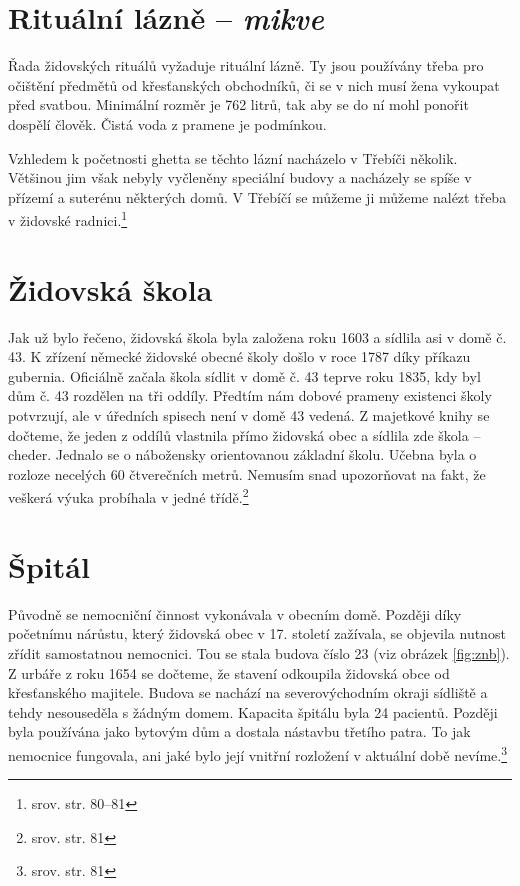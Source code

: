 \documentclass[a4paper,oneside,12pt]{report}
\begin{document}
\section{Rituální lázně -- \textit{mikve}}

Řada židovských rituálů vyžaduje rituální lázně.
Ty jsou používány třeba pro očištění předmětů od křesťanských obchodníků, či se v nich musí žena vykoupat před svatbou.
Minimální rozměr je 762 litrů, tak aby se do ní mohl ponořit dospělí člověk.
Čistá voda z pramene je podmínkou.

Vzhledem k početnosti ghetta se těchto lázní nacházelo v Třebíči několik.
Většinou jim však nebyly vyčleněny speciální budovy a nacházely se spíše v přízemí a suterénu některých domů.
V Třebíčí se můžeme ji můžeme nalézt třeba v židovské radnici.\footnote{srov. \cite{Fiser2005} str. 80--81}

\section{Židovská škola}

Jak už bylo řečeno, židovská škola byla založena roku 1603 a sídlila asi v domě č. 43.
K zřízení německé židovské obecné školy došlo v roce 1787 díky příkazu gubernia.
Oficiálně začala škola sídlit v domě č. 43 teprve roku 1835, kdy byl dům č. 43 rozdělen na tři oddíly.
Předtím nám dobové prameny existenci školy potvrzují, ale v úředních spisech není v domě 43 vedená.
Z majetkové knihy se dočteme, že jeden z oddílů vlastnila přímo židovská obec a sídlila zde škola -- cheder.
Jednalo se o nábožensky orientovanou základní školu.
Učebna byla o rozloze necelých 60 čtverečních metrů.
Nemusím snad upozorňovat na fakt, že veškerá výuka probíhala v jedné třídě.\footnote{srov. \cite{Fiser2005} str. 81}

\section{Špitál}

Původně se nemocniční činnost vykonávala v obecním domě.
Později díky početnímu nárůstu, který židovská obec v 17. století zažívala, se objevila nutnost zřídit samostatnou nemocnici.
Tou se stala budova číslo 23 (viz obrázek \ref{fig:znb}).
Z urbáře z roku 1654 se dočteme, že stavení odkoupila židovská obce od křesťanského majitele.
Budova se nachází na severovýchodním okraji sídliště a tehdy nesouseděla s žádným domem.
Kapacita špitálu byla 24 pacientů.
Později byla používána jako bytovým dům a dostala nástavbu třetího patra.
To jak nemocnice fungovala, ani jaké bylo její vnitřní rozložení v aktuální době nevíme.\footnote{srov. \cite{Fiser2005} str. 81}
\end{document}
